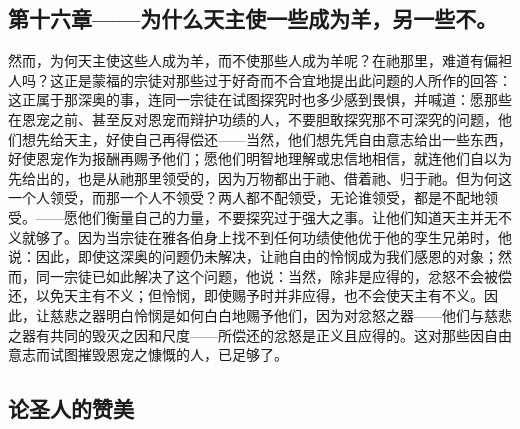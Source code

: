 \subsection{第十六章——为什么天主使一些成为羊，另一些不。}

然而，为何天主使这些人成为羊，而不使那些人成为羊呢？在祂那里，难道有偏袒人吗？这正是蒙福的宗徒对那些过于好奇而不合宜地提出此问题的人所作的回答：这正属于那深奥的事，连同一宗徒在试图探究时也多少感到畏惧，并喊道：愿那些在恩宠之前、甚至反对恩宠而辩护功绩的人，不要胆敢探究那不可深究的问题，他们想先给天主，好使自己再得偿还——当然，他们想先凭自由意志给出一些东西，好使恩宠作为报酬再赐予他们；愿他们明智地理解或忠信地相信，就连他们自以为先给出的，也是从祂那里领受的，因为万物都出于祂、借着祂、归于祂。但为何这一个人领受，而那一个人不领受？两人都不配领受，无论谁领受，都是不配地领受。——愿他们衡量自己的力量，不要探究过于强大之事。让他们知道天主并无不义就够了。因为当宗徒在雅各伯身上找不到任何功绩使他优于他的孪生兄弟时，他说：因此，即使这深奥的问题仍未解决，让祂自由的怜悯成为我们感恩的对象；然而，同一宗徒已如此解决了这个问题，他说：当然，除非是应得的，忿怒不会被偿还，以免天主有不义；但怜悯，即使赐予时并非应得，也不会使天主有不义。因此，让慈悲之器明白怜悯是如何白白地赐予他们，因为对忿怒之器——他们与慈悲之器有共同的毁灭之因和尺度——所偿还的忿怒是正义且应得的。这对那些因自由意志而试图摧毁恩宠之慷慨的人，已足够了。\par


\subsection{论圣人的赞美}

